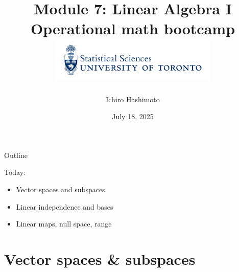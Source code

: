 \documentclass [aspectratio=169]{beamer}
\title[]{Module 7: Linear Algebra I \\ {\large Operational math bootcamp}\\ \includegraphics[width=8cm]{dept_logo.png}\vspace{-1em}}
\author[]{Ichiro Hashimoto}
\institute[]{University of Toronto}
\date{July 18, 2025}
\begin{document}
{
\begin{frame}
    \titlepage
\end{frame}
}

\begin{frame}{Outline}


Today:
    \begin{itemize}
      \setlength\itemsep{0.5em}
         \item Vector spaces and subspaces
    	\item Linear independence and bases
	\item Linear maps, null space, range
    \end{itemize}
\end{frame}

\section{Vector spaces \& subspaces}
\end{document}
